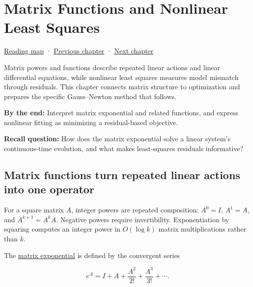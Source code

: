 \chapter{Matrix Functions and Nonlinear Least Squares}\label{02-foundations-ii-ch026-matrix-functions-and-nonlinear-least-squares}\hypertarget{02-foundations-ii-ch026}{}\label{stagechapter:02-foundations-ii-ch026}

\hypertarget{02-foundations-ii-ch026-matrix-functions-and-nonlinear-least-squares}{}

\hyperref[volume-reading-map]{Reading map} · \hyperref[02-foundations-ii-ch025-continuous-models-and-numerical-error]{Previous chapter} · \hyperref[02-foundations-ii-ch027-gaussnewton-for-geometry-and-pose]{Next chapter}

Matrix powers and functions describe repeated linear actions and linear differential equations, while nonlinear least squares measures model mismatch through residuals. This chapter connects matrix structure to optimization and prepares the specific Gauss--Newton method that follows.

\textbf{By the end:} Interpret matrix exponential and related functions, and express nonlinear fitting as minimizing a residual-based objective.

\textbf{Recall question:} How does the matrix exponential solve a linear system's continuous-time evolution, and what makes least-squares residuals informative?

\section{Matrix functions turn repeated linear actions into one operator}\label{02-foundations-ii-ch026-matrix-functions-turn-repeated-linear-actions-into-one-operator}

\hypertarget{02-foundations-ii-ch026-matrix-functions-turn-repeated-linear-actions-into-one-operator}{}

For a square matrix \(A\), integer powers are repeated composition: \(A^0=I\), \(A^1=A\), and \(A^{k+1}=A^kA\). Negative powers require invertibility. Exponentiation by squaring computes an integer power in \(O(\log k)\) matrix multiplications rather than \(k\).

The \hyperref[02-foundations-ii-ch026-matrix-functions-turn-repeated-linear-actions-into-one-operator]{matrix exponential} is defined by the convergent series

\[
e^A=I+A+\frac{A^2}{2!}+\frac{A^3}{3!}+\cdots.
\]

